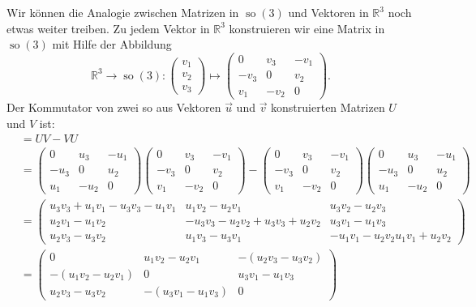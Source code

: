 Wir können die Analogie zwischen Matrizen in $\operatorname{so}(3)$ und
Vektoren in $\mathbb R^3$ noch etwas weiter treiben. Zu jedem Vektor
in $\mathbb R^3$ konstruieren wir eine Matrix in $\operatorname{so}(3)$
mit Hilfe der Abbildung
\[
\mathbb R^3\to\operatorname{so}(3)
:
\begin{pmatrix}v_1\\v_2\\v_3\end{pmatrix}
\mapsto
\begin{pmatrix}
  0 & v_3&-v_1\\
-v_3&  0 & v_2\\
 v_1&-v_2&  0
\end{pmatrix}.
\]
Der Kommutator von zwei so aus Vektoren $\vec u$ und $\vec v$
konstruierten Matrizen $U$ und $V$ ist:
\begin{align*}
[U,V]
&=
UV-VU
\\
&=
\begin{pmatrix}
  0 & u_3&-u_1\\
-u_3&  0 & u_2\\
 u_1&-u_2&  0
\end{pmatrix}
\begin{pmatrix}
  0 & v_3&-v_1\\
-v_3&  0 & v_2\\
 v_1&-v_2&  0
\end{pmatrix}
-
\begin{pmatrix}
  0 & v_3&-v_1\\
-v_3&  0 & v_2\\
 v_1&-v_2&  0
\end{pmatrix}
\begin{pmatrix}
  0 & u_3&-u_1\\
-u_3&  0 & u_2\\
 u_1&-u_2&  0
\end{pmatrix}
\\
&=
\begin{pmatrix}
u_3v_3+u_1v_1 - u_3v_3 - u_1v_1
        & u_1v_2 - u_2v_1
                & u_3v_2 - u_2v_3
\\
u_2v_1 - u_1v_2
        & -u_3v_3-u_2v_2 + u_3v_3+u_2v_2
                & u_3v_1 - u_1v_3
\\
u_2v_3 - u_3v_2
        & u_1v_3 - u_3v_1
                &-u_1v_1-u_2v_2 u_1v_1+u_2v_2
\end{pmatrix}
\\
&=
\begin{pmatrix}
0
        & u_1v_2 - u_2v_1
                &-(u_2v_3-u_3v_2)
\\
-( u_1v_2 - u_2v_1)
        & 0
                & u_3v_1 - u_1v_3
\\
u_2v_3 - u_3v_2
        &-( u_3v_1 - u_1v_3)
                & 0
\end{pmatrix}
\end{align*}
